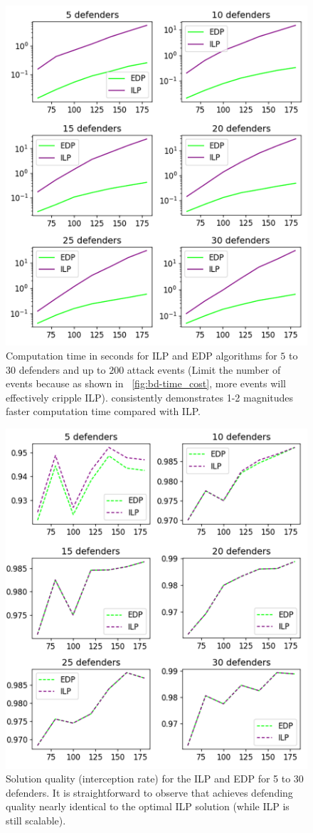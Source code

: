 \begin{figure}[h!]
    \centering
    \includegraphics[width=.5\linewidth]{chapters/bd/fig/def_timecost-v.png}
    \caption[Computation time in seconds for ILP and EDP algorithms]{Computation time in seconds for ILP and EDP algorithms for $5$ to $30$ defenders and up to $200$ 
    attack events (Limit the number of events because as shown in ~\ref{fig:bd-time_cost}, 
    more events will effectively cripple ILP). \ours consistently demonstrates 1-2 magnitudes faster computation time compared with ILP.}
    \label{fig:bd-def_time_cost}
\end{figure}

\begin{figure}[h!]
    \centering
    \includegraphics[width=.5\linewidth]{chapters/bd/fig/def_quality-v.png}
    \caption[Solution quality (interception rate) for the ILP and EDP]{Solution quality (interception rate) for the ILP and EDP for 5 to 30 defenders. 
    It is straightforward to observe that \ours achieves defending quality nearly identical to the optimal ILP solution (while ILP is still scalable).}
    \label{fig:bd-def_quality}
\end{figure}

